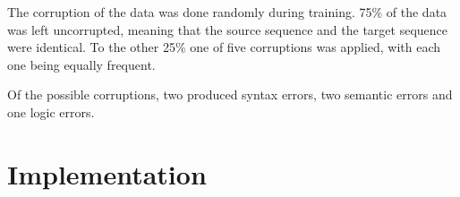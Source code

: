The corruption of the data was done randomly during training. 75\% of the data was left uncorrupted, meaning that the source sequence and the target sequence were identical. To the other 25\% one of five corruptions was applied, with each one being equally frequent.

Of the possible corruptions, two produced syntax errors, two semantic errors and one logic errors.

\section{Implementation}
